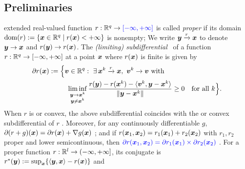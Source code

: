 \section{}
\label{Section: Problem Reformulation}
\subsection{{Preliminaries}}
 extended real-valued function $r:\mathbb{R}^{q}\to{\color{blue}[-\infty,+\infty]}$ is called
\textit{proper} if  its domain
$\operatorname{dom}(r):=\{\bm{x}\in\mathbb{R}^{q}\mid r(\bm{x})<+\infty\}$ is nonempty; 
We write
$\bm{y}\xrightarrow{r}\bm{x}$ to denote $\bm{y}\to\bm{x}$ and $r(\bm{y})\to r(\bm{x})$. The \textit{(limiting) subdifferential}~\cite[Definition~8.3]{Rockafellar1998VariationalA} of a function $r:\mathbb{R}^{q}\to[-\infty,+\infty]$ at a point
$\bm{x}$ where $r(\bm{x})$ is finite is given by
\begin{equation}\label{Eq: limiting subdifferential}
\begin{aligned}
\partial r(\bx):={}&\Bigl\{\bv\in\RR^{q}:\ \exists\,\bx^{k}\xrightarrow{r}\bx,\ \bv^{k}\to\bv\ \text{with}\\
&\quad \liminf_{\substack{\by\to\bx^{k}\\ \by\neq\bx^{k}}}
\frac{r(\by)-r(\bx^{k})-\langle\bv^{k},\by-\bx^{k}\rangle}{\|\by-\bx^{k}\|}
\ge0\quad\text{for all } k\Bigr\}.
\end{aligned}
\end{equation}When $r$ is  or convex, the above subdifferential coincides with the
 or convex subdifferential of $r$
\cite[Exercise~8.8(b) and Proposition~8.12]{Rockafellar1998VariationalA}.
Moreover, for any continuously differentiable $g$,
$\partial(r+g)(\bm{x})=\partial r(\bm{x})+\nabla g(\bm{x})$
\cite[Exercise~8.8(c)]{Rockafellar1998VariationalA}; and if
$r(\bm{x}_{1},\bm{x}_{2})=r_{1}(\bm{x}_{1})+r_{2}(\bm{x}_{2})$ with $r_{1},r_{2}$ proper and lower
semicontinuous, then ${\color{blue}\partial r(\bm{x}_{1},\bm{x}_{2})=\partial r_{1}(\bm{x}_{1})\times\partial r_{2}(\bm{x}_{2})}$
\cite[Proposition~10.5]{Rockafellar1998VariationalA}.
For a proper function $r:\mathbb{R}^{l}\to(-\infty,+\infty]$, its conjugate is $r^*(\bm{y}):=\sup_{\bm{x}}\{\langle\bm{y},\bm{x}\rangle-r(\bm{x})\}$ and  
